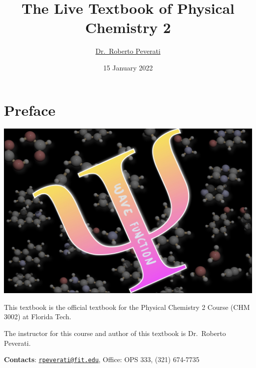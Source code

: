 \documentclass[
  9pt,
]{extbook}
\title{The Live Textbook of Physical Chemistry 2}
\author{\href{mailto:rpeverati@fit.edu}{Dr.~Roberto Peverati}}
\date{15 January 2022}
\let\oldmaketitle\maketitle
\theoremstyle{definition}
\theoremstyle{definition}
\theoremstyle{definition}
\theoremstyle{remark}
\begin{document}
\maketitle


%
\newpage

\let\maketitle\oldmaketitle

\renewcommand\thepage{\romannumeral\numexpr\value{page}-1\relax}


{
\setcounter{tocdepth}{1}
\tableofcontents
}
\renewcommand{\arraystretch}{1.8}

\hypertarget{preface}{%
\chapter*{Preface}\label{preface}}

\begin{center}\includegraphics[width=0.8\linewidth]{./img/OEP_Figures.000} \end{center}

This textbook is the official textbook for the Physical Chemistry 2 Course (CHM 3002) at Florida Tech.

The instructor for this course and author of this textbook is Dr.~Roberto Peverati.

\textbf{Contacts}: \href{mailto:rpeverati@fit.edu}{\nolinkurl{rpeverati@fit.edu}}, Office: OPS 333, (321) 674-7735
\end{document}
